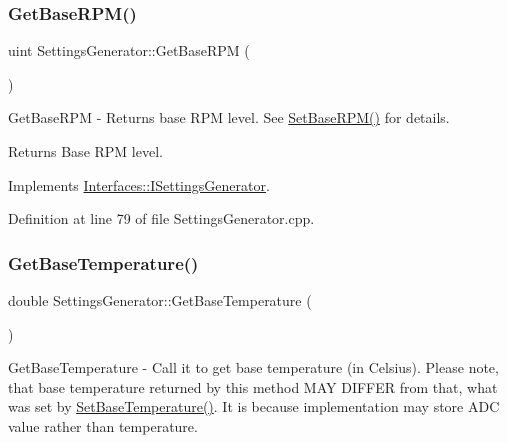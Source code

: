 \subsubsection{\texorpdfstring{Get\+Base\+R\+P\+M()}{GetBaseRPM()}}
{\footnotesize\ttfamily uint Settings\+Generator\+::\+Get\+Base\+R\+PM (\begin{DoxyParamCaption}{ }\end{DoxyParamCaption})\hspace{0.3cm}{\ttfamily [virtual]}}



Get\+Base\+R\+PM -\/ Returns base R\+PM level. See \hyperlink{class_settings_generator_a1c1960b9021f7081b4c42c4d7c0eda34}{Set\+Base\+R\+P\+M()} for details. 

\begin{DoxyReturn}{Returns}
Base R\+PM level. 
\end{DoxyReturn}


Implements \hyperlink{class_interfaces_1_1_i_settings_generator_ad088253da57b2ee0b94fe6fd1fb2dfdd}{Interfaces\+::\+I\+Settings\+Generator}.



Definition at line 79 of file Settings\+Generator.\+cpp.

\mbox{\label{class_settings_generator_a80b1ff8060a16d149989d98a88ab253e}} 
\subsubsection{\texorpdfstring{Get\+Base\+Temperature()}{GetBaseTemperature()}}
{\footnotesize\ttfamily double Settings\+Generator\+::\+Get\+Base\+Temperature (\begin{DoxyParamCaption}{ }\end{DoxyParamCaption})\hspace{0.3cm}{\ttfamily [virtual]}}



Get\+Base\+Temperature -\/ Call it to get base temperature (in Celsius). Please note, that base temperature returned by this method M\+AY D\+I\+F\+F\+ER from that, what was set by \hyperlink{class_settings_generator_aed9e7acb30bfd559b1ac70ceeddd8973}{Set\+Base\+Temperature()}. It is because implementation may store A\+DC value rather than temperature. 

